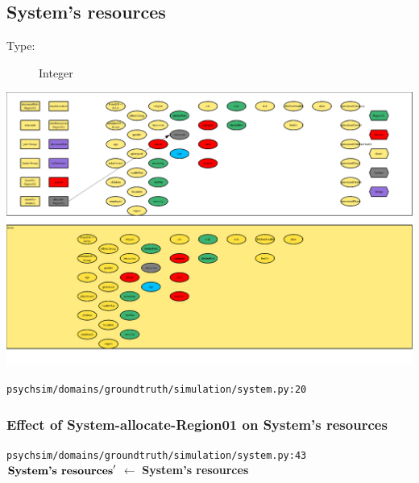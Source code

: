 \documentclass{article}%
\begin{document}
%
\subsection{System's resources}%
\label{subsec:System's resources}%
\begin{description}%
\item[Type:]%
Integer%
\end{description}%
\includegraphics[width=\textwidth]{images/resourcesOfSystem.png}%
\begin{flushleft}%
\verb|psychsim/domains/groundtruth/simulation/system.py:20|%
\end{flushleft}%
\subsubsection{Effect of System{-}allocate{-}Region01 on System's resources}%
\label{ssubsec:Effect of System{-}allocate{-}Region01 on System's resources}%
\begin{flushleft}%
\verb|psychsim/domains/groundtruth/simulation/system.py:43|%
\linebreak%
$\mbox{\textbf{System's resources}} '$%
$\leftarrow$%
\textbf{System's resources}%
\end{flushleft}

%
\end{document}
